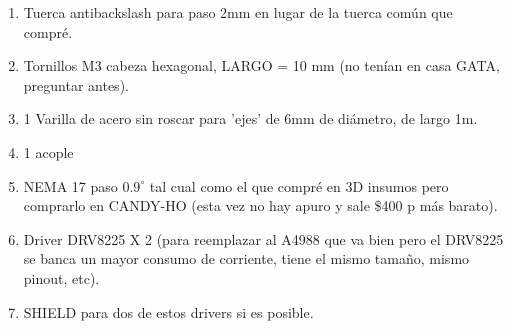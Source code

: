 \documentclass[12pt,dvipsnames]{exam}
\begin{document}
\begin{enumerate}
	\item Tuerca antibackslash para paso 2mm en lugar de la tuerca común que compré.
	\item Tornillos M3 cabeza hexagonal, LARGO = 10 mm (no tenían en casa GATA, preguntar antes).
	\item 1 Varilla de acero sin roscar para 'ejes' de 6mm de diámetro, de largo 1m.
	\item 1 acople
	\item NEMA 17 paso $0.9^{\circ}$ tal cual como el que compré en 3D insumos pero comprarlo en CANDY-HO (esta vez no hay apuro y sale \$400 p más barato).	
	\item Driver DRV8225 X 2 (para reemplazar al A4988 que va bien pero el DRV8225 se banca un mayor consumo de corriente, tiene el mismo tamaño, mismo pinout, etc).
	\item SHIELD para dos de estos drivers si es posible.
\end{enumerate}
\end{document}
